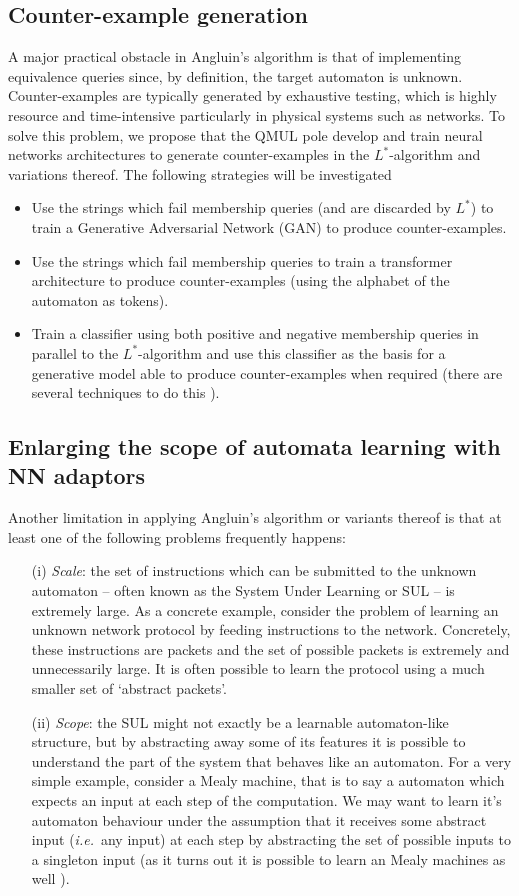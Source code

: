 \documentclass[11pt,a4paper]{article}
\newcommand{\ie}{\textit{i.e.}\ }
\newcommand{\Ls}{$L^\ast$\xspace}
\begin{document}
		\subsection{Counter-example generation}
			A major practical obstacle in Angluin's algorithm is that of implementing equivalence queries since, by definition, the target automaton is unknown. Counter-examples are typically generated by exhaustive testing, which is highly resource and time-intensive particularly in physical systems such as networks. To solve this problem, we propose that the  QMUL pole develop and train neural networks architectures to generate counter-examples in the \Ls-algorithm and variations thereof. The following strategies will be investigated
			\begin{itemize}
				\item Use the strings which fail membership queries (and are discarded by \Ls) to train a Generative Adversarial Network (GAN) to produce counter-examples.
				\item Use the strings which fail membership queries to train a transformer architecture to produce counter-examples (using the alphabet of the automaton as tokens).
				\item Train a classifier using both positive and negative membership queries in parallel to the $L^\ast$-algorithm and use this classifier as the basis for a generative model able to produce counter-examples when required (there are several techniques to do this \cite{?}).
			\end{itemize}
		
		
		\subsection{Enlarging the scope of automata learning with NN adaptors}
			Another limitation in applying Angluin's algorithm or variants thereof is that at least one of the following problems frequently happens:
			\begin{itemize}
				\item[(i)] \emph{Scale}: the set of instructions which can be submitted to the unknown automaton -- often known as the System Under Learning or SUL -- is extremely large. As a concrete example, consider the problem of learning an unknown network protocol by feeding instructions to the network. Concretely, these instructions are packets and the set of possible packets is extremely and unnecessarily large. It is often possible to learn the protocol using a much smaller set of `abstract packets'.
				\item[(ii)] \emph{Scope}: the SUL might not exactly be a learnable automaton-like structure, but by abstracting away some of its features it is possible to understand the part of the system that behaves like an automaton. For a very simple example, consider a Mealy machine, that is to say a automaton which expects an input at each step of the computation. We may want to learn it's automaton behaviour under the assumption that it receives some abstract input (\ie any input) at each step by abstracting the set of possible inputs to a singleton input (as it turns out it is possible to learn an Mealy machines as well \cite{?}).
			\end{itemize}
		
\end{document}
